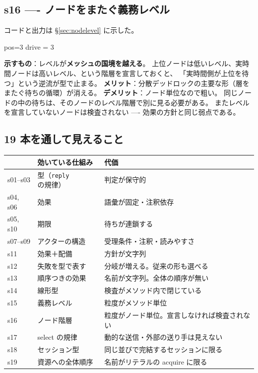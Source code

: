 \documentclass[11pt,a4paper]{ltjsarticle}
\theoremstyle{definition}
\theoremstyle{remark}
\begin{document}
\subsection{s16 ---- ノードをまたぐ義務レベル}
コードと出力は \S\ref{sec:nodelevel} に示した。
\begin{term}
pos=3
drive = 3
\end{term}
\textbf{示すもの}：レベルが\textbf{メッシュの国境を越える}。
上位ノードは低いレベル、実時間ノードは高いレベル、という階層を宣言しておくと、
「実時間側が上位を待つ」という逆流が型で止まる。
\textbf{メリット}：分散デッドロックの主要な形（層をまたぐ待ちの循環）が消える。
\textbf{デメリット}：ノード単位なので粗い。
同じノードの中の待ちは、そのノードのレベル階層で別に見る必要がある。
またレベルを宣言していないノードは検査されない ---- 効果の方針と同じ弱点である。

\subsection{19 本を通して見えること}

\begin{center}
\begin{tabular}{lll}
\toprule
& 効いている仕組み & 代価 \\
\midrule
s01--s03 & 型（\texttt{reply} の規律） & 判定が保守的 \\
s04, s06 & 効果 & 語彙が固定・注釈依存 \\
s05, s10 & 期限 & 待ちが連鎖する \\
s07--s09 & アクターの構造 & 受理条件・注釈・読みやすさ \\
s11 & 効果＋配備 & 方針が文字列 \\
s12 & 失敗を型で表す & 分岐が増える。従来の形も選べる \\
s13 & 順序つきの効果 & 名前が文字列。全体の順序が無い \\
s14 & 線形型 & 検査がメソッド内で閉じている \\
s15 & 義務レベル & 粒度がメソッド単位 \\
s16 & ノード階層 & 粒度がノード単位。宣言しなければ検査されない \\
s17 & select の規律 & 動的な送信・外部の送り手は見えない \\
s18 & セッション型 & 同じ並びで完結するセッションに限る \\
s19 & 資源への全体順序 & 名前がリテラルの acquire に限る \\
\bottomrule
\end{tabular}
\end{center}
\end{document}
